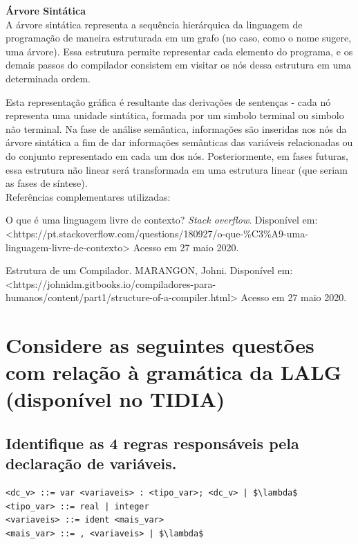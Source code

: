 \documentclass{article}
\begin{document}
\textbf{Árvore Sintática}
\\

A árvore sintática representa a sequência hierárquica da linguagem de programação de maneira estruturada em um grafo (no caso, como o nome sugere, uma árvore). Essa estrutura permite representar cada elemento do programa, e os demais passos do compilador consistem em visitar os nós dessa estrutura em uma determinada ordem.

Esta representação gráfica é resultante das derivações de sentenças - cada nó representa uma unidade sintática, formada por um simbolo terminal ou simbolo não terminal. Na fase de análise semântica, informações são inseridas nos nós da árvore sintática a fim de dar informações semânticas das variáveis relacionadas ou do conjunto representado em cada um dos nós. Posteriormente, em fases futuras, essa estrutura não linear será transformada em uma estrutura linear (que seriam as fases de síntese).
\\

Referências complementares utilizadas:

O que é uma linguagem livre de contexto? \textit{Stack overflow}. Disponível em:\\<https://pt.stackoverflow.com/questions/180927/o-que-\%C3\%A9-uma-linguagem-livre-de-contexto> Acesso em 27 maio 2020.

Estrutura de um Compilador. MARANGON, Johni. Disponível em:\\ <https://johnidm.gitbooks.io/compiladores-para-humanos/content/part1/structure-of-a-compiler.html> Acesso em 27 maio 2020.

\newpage
\section{ Considere as seguintes questões com relação à gramática da LALG (disponível no TIDIA)}

\subsection{Identifique as 4 regras responsáveis pela declaração de variáveis.}
\begin{lstlisting}
<dc_v> ::= var <variaveis> : <tipo_var>; <dc_v> | $\lambda$
<tipo_var> ::= real | integer
<variaveis> ::= ident <mais_var>
<mais_var> ::= , <variaveis> | $\lambda$
\end{lstlisting}
\end{document}
